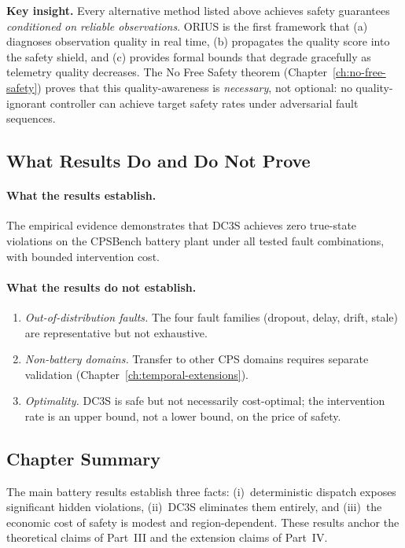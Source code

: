 \noindent\textbf{Key insight.}  Every alternative method listed above
achieves safety guarantees \emph{conditioned on reliable observations}.
ORIUS is the first framework that (a) diagnoses observation quality in
real time, (b) propagates the quality score into the safety shield, and
(c) provides formal bounds that degrade gracefully as telemetry quality
decreases.  The No Free Safety theorem (Chapter~\ref{ch:no-free-safety})
proves that this quality-awareness is \emph{necessary}, not optional:
no quality-ignorant controller can achieve target safety rates under
adversarial fault sequences.

\subsection{What Results Do and Do Not Prove}

\paragraph{What the results establish.}
The empirical evidence demonstrates that DC3S achieves zero true-state
violations on the CPSBench battery plant under all tested fault
combinations, with bounded intervention cost.

\paragraph{What the results do not establish.}
\begin{enumerate}
  \item \emph{Out-of-distribution faults.}  The four fault families
    (dropout, delay, drift, stale) are representative but not exhaustive.
  \item \emph{Non-battery domains.}  Transfer to other CPS domains
    requires separate validation (Chapter~\ref{ch:temporal-extensions}).
  \item \emph{Optimality.}  DC3S is safe but not necessarily cost-optimal;
    the intervention rate is an upper bound, not a lower bound, on the
    price of safety.
\end{enumerate}

\subsection{Chapter Summary}

The main battery results establish three facts: (i)~deterministic dispatch
exposes significant hidden violations, (ii)~DC3S eliminates them entirely,
and (iii)~the economic cost of safety is modest and region-dependent.
These results anchor the theoretical claims of Part~III and the extension
claims of Part~IV.


